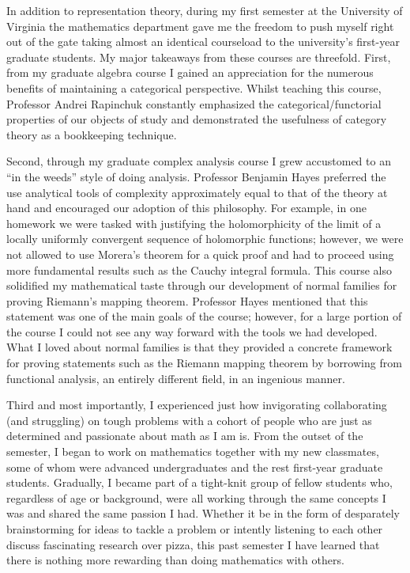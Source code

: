 \documentclass[11pt]{article}
\begin{document}

In addition to representation theory, during my first semester at the University of Virginia the mathematics department gave me the freedom to push myself right out of the gate taking almost an identical courseload to the university's first-year graduate students. My major takeaways from these courses are threefold. First, from my graduate algebra course I gained an appreciation for the numerous benefits of maintaining a categorical perspective. Whilst teaching this course, Professor Andrei Rapinchuk constantly emphasized the categorical/functorial properties of our objects of study and demonstrated the usefulness of category theory as a bookkeeping technique.

Second, through my graduate complex analysis course I grew accustomed to an ``in the weeds'' style of doing analysis. Professor Benjamin Hayes preferred the use analytical tools of complexity approximately equal to that of the theory at hand and encouraged our adoption of this philosophy. For example, in one homework we were tasked with justifying the holomorphicity of the limit of a locally uniformly convergent sequence of holomorphic functions; however, we were not allowed to use Morera's theorem for a quick proof and had to proceed using more fundamental results such as the Cauchy integral formula. This course also solidified my mathematical taste through our development of normal families for proving Riemann's mapping theorem. Professor Hayes mentioned that this statement was one of the main goals of the course; however, for a large portion of the course I could not see any way forward with the tools we had developed. What I loved about normal families is that they provided a concrete framework for proving statements such as the Riemann mapping theorem by borrowing from functional analysis, an entirely different field, in an ingenious manner.

Third and most importantly, I experienced just how invigorating collaborating (and struggling) on tough problems with a cohort of people who are just as determined and passionate about math as I am is. From the outset of the semester, I began to work on mathematics together with my new classmates, some of whom were advanced undergraduates and the rest first-year graduate students. Gradually, I became part of a tight-knit group of fellow students who, regardless of age or background, were all working through the same concepts I was and shared the same passion I had. Whether it be in the form of desparately brainstorming for ideas to tackle a problem or intently listening to each other discuss fascinating research over pizza, this past semester I have learned that there is nothing more rewarding than doing mathematics with others.
\end{document}
